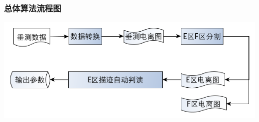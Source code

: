 \documentclass[notheorems,mathserif,table,compress]{beamer}  %
\begin{document}
 
\begin{frame}
 \frametitle{总体算法流程图}
\begin{center}
\includegraphics[width=0.9\linewidth]{总体流程图.png}%
\end{center}
\end{frame}



\end{document}
